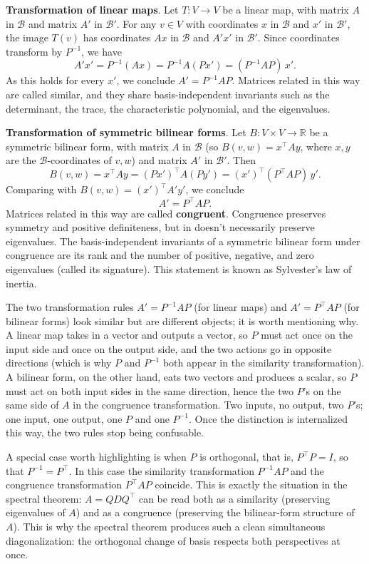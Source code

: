 \documentclass{article}
\begin{document}
\textbf{Transformation of linear maps}. Let $T: V \to V$ be a linear map, with matrix $A$ in $\mathcal{B}$ and matrix $A'$ in $\mathcal{B}'$. For any $v \in V$ with coordinates $x$ in $\mathcal{B}$ and $x'$ in $\mathcal{B}'$, the image $T(v)$ has coordinates $Ax$ in $\mathcal{B}$ and $A'x'$ in $\mathcal{B}'$. Since coordinates transform by $P^{-1}$, we have
$$A' x' = P^{-1}(Ax) = P^{-1} A (P x') = (P^{-1} A P)\, x'.$$
As this holds for every $x'$, we conclude $A' = P^{-1} A P.$ Matrices related in this way are called similar, and they share basis-independent invariants such as the determinant, the trace, the characteristic polynomial, and the eigenvalues.
 
\textbf{Transformation of symmetric bilinear forms}. Let $B: V \times V \to \mathbb{R}$ be a symmetric bilinear form, with matrix $A$ in $\mathcal{B}$ (so $B(v, w) = x^\top A y$, where $x, y$ are the $\mathcal{B}$-coordinates of $v, w$) and matrix $A'$ in $\mathcal{B}'$. Then
$$B(v, w) = x^\top A y = (Px')^\top A (P y') = (x')^\top (P^\top A P)\, y'.$$
Comparing with $B(v, w) = (x')^\top A' y'$, we conclude
$$A' = P^\top A P.$$
Matrices related in this way are called \textbf{congruent}. Congruence preserves symmetry and positive definiteness, but in doesn't necessarily preserve eigenvalues. The basis-independent invariants of a symmetric bilinear form under congruence are its rank and the number of positive, negative, and zero eigenvalues (called its signature). This statement is known as Sylvester's law of inertia.
 
The two transformation rules $A' = P^{-1} A P$ (for linear maps) and $A' = P^\top A P$ (for bilinear forms) look similar but are different objects; it is worth mentioning why. A linear map takes in a vector and outputs a vector, so $P$ must act once on the input side and once on the output side, and the two actions go in opposite directions (which is why $P$ and $P^{-1}$ both appear in the similarity transformation). A bilinear form, on the other hand, eats two vectors and produces a scalar, so $P$ must act on both input sides in the same direction, hence the two $P$'s on the same side of $A$ in the congruence transformation. Two inputs, no output, two $P$'s; one input, one output, one $P$ and one $P^{-1}$. Once the distinction is internalized this way, the two rules stop being confusable.
 
A special case worth highlighting is when $P$ is orthogonal, that is, $P^\top P = I$, so that $P^{-1} = P^\top$. In this case the similarity transformation $P^{-1} A P$ and the congruence transformation $P^\top A P$ coincide. This is exactly the situation in the spectral theorem: $A = QDQ^\top$ can be read both as a similarity (preserving eigenvalues of $A$) and as a congruence (preserving the bilinear-form structure of $A$). This is why the spectral theorem produces such a clean simultaneous diagonalization: the orthogonal change of basis respects both perspectives at once.
 
\end{document}
